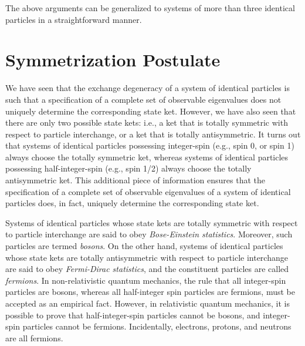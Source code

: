 The above arguments can be generalized to systems of more than three identical particles in a straightforward manner. 

\section{Symmetrization Postulate}
We have seen that the exchange degeneracy of a  system of identical particles is such that a specification of a complete set of
observable eigenvalues does not uniquely determine the corresponding state ket. However, we have also seen that there are only two
possible state kets: i.e., a ket that is totally symmetric with respect to particle interchange, or a ket that is totally antisymmetric. 
It turns out that systems of identical particles possessing integer-spin (e.g., spin 0, or spin 1) always choose the totally symmetric
ket, whereas systems of identical particles possessing half-integer-spin (e.g., spin 1/2) always choose the totally antisymmetric ket. 
This additional piece of information ensures that the specification of a complete set of
observable eigenvalues of a system of identical particles does, in fact,  uniquely determine the corresponding state ket. 

Systems of identical particles whose state kets are totally symmetric with respect to particle interchange are said to
obey {\em Bose-Einstein statistics}. Moreover, such particles are termed {\em bosons}. On the other hand,
systems of identical particles whose state kets are totally antisymmetric with respect to particle interchange are said to
obey {\em Fermi-Dirac statistics}, and the constituent particles are called {\em fermions}. In non-relativistic quantum mechanics, the rule that all integer-spin particles are bosons, whereas all half-integer spin
particles are fermions, must be accepted as an empirical fact. However, in relativistic quantum mechanics, it is possible
to prove that half-integer-spin particles cannot be bosons, and integer-spin particles cannot be fermions. 
Incidentally, electrons, protons, and neutrons are all fermions.

